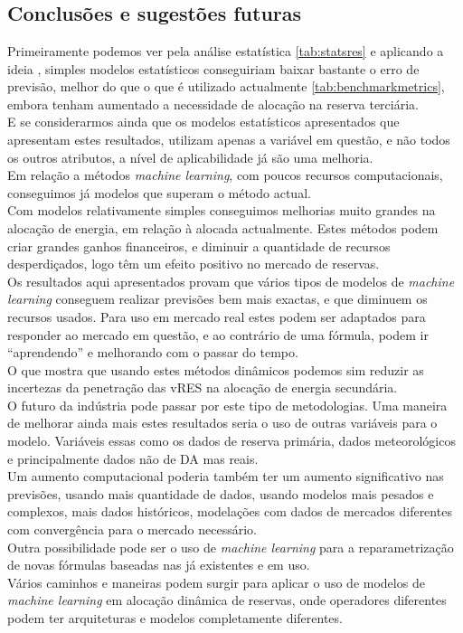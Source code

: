 \part[]{}{}

\chapter{Conclusões e sugestões futuras}

Primeiramente podemos ver pela análise estatística \ref{tab:statsres} e aplicando a ideia \cite{Elsayed}, simples modelos estatísticos conseguiriam baixar bastante o erro de previsão, melhor do que o que é utilizado actualmente \ref{tab:benchmarkmetrics}, embora tenham aumentado a necessidade de alocação na reserva terciária.\\
E se considerarmos ainda que os modelos estatísticos apresentados que apresentam estes resultados, utilizam apenas a variável em questão, e não todos os outros atributos, a nível de aplicabilidade já são uma melhoria. \\
Em relação a métodos \textit{machine learning}, com poucos recursos computacionais, conseguimos já modelos que superam o método actual.\\
Com modelos relativamente simples conseguimos melhorias muito grandes na alocação de energia, em relação à alocada actualmente. Estes métodos podem criar grandes ganhos financeiros, e diminuir a quantidade de recursos desperdiçados, logo têm um efeito positivo no mercado de reservas.\\
Os resultados aqui apresentados provam que vários tipos de modelos de \textit{machine learning} conseguem realizar previsões bem mais exactas, e que diminuem os recursos usados. Para uso em mercado real estes podem ser adaptados para responder ao mercado em questão, e ao contrário de uma fórmula, podem ir “aprendendo” e melhorando com o passar do tempo.\\
O que mostra que usando estes métodos dinâmicos podemos sim reduzir as incertezas da penetração das \gls{vRES} na alocação de energia secundária.\\
O futuro da indústria pode passar por este tipo de metodologias. Uma maneira de melhorar ainda mais estes resultados seria o uso de outras variáveis para o modelo. Variáveis essas como os dados de reserva primária, dados meteorológicos e principalmente dados não de \gls{DA} mas reais.\\
Um aumento computacional poderia também ter um aumento significativo nas previsões, usando mais quantidade de dados, usando modelos mais pesados e complexos, mais dados históricos, modelações com dados de mercados diferentes com convergência para o mercado necessário.\\
Outra possibilidade pode ser o uso de \textit{machine learning} para a reparametrização de novas fórmulas baseadas nas já existentes e em uso.\\
Vários caminhos e maneiras podem surgir para aplicar o uso de modelos de \textit{machine learning} em alocação dinâmica de reservas, onde operadores diferentes podem ter arquiteturas e modelos completamente diferentes.
